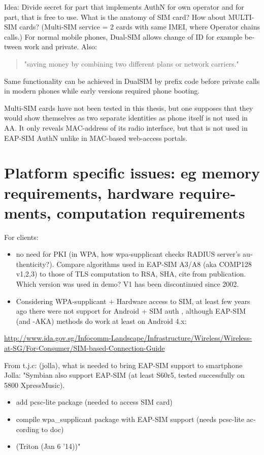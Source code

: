 \documentclass[12pt,a4paper,english]{tutthesis}
\begin{document}
\begin{otherlanguage}{english}
Idea: Divide secret for part that implements AuthN for own operator and
for part, that is free to use. What is the anatomy of SIM card?  How
about MULTI-SIM cards? (Multi-SIM service = 2 cards with same IMEI,
where Operator chains calls.)  For normal mobile phones, Dual-SIM
allows change of ID for example between work and private. Also:
\begin{quote}
"saving money by combining two different plans or  network carriers." 
\end{quote}

Same functionality can be achieved in DualSIM by prefix code before
private calls in modern phones while early versions required 
phone booting.

Multi-SIM cards have not been tested in this thesis, but one supposes
that they would show themselves as two separate identities as 
phone itself is not used in AA. It only reveals  MAC-address of its
radio interface, but that is not used in EAP-SIM AuthN unlike in MAC-based web-access portals.


\section{Platform specific issues: eg memory requirements, hardware requirements, computation requirements}
\label{sec-6-3}

For clients: 
\begin{itemize}
\item no need for PKI (in WPA, how wpa-supplicant checks RADIUS server's
authenticity?). Compare algorithms used in EAP-SIM A3/A8 (aka
COMP128 v1,2,3) to those of
TLS computation to RSA, SHA, cite from publication.
Which version was used in demo? V1 has been discontinued since 2002.

\item Considering WPA-supplicant + Hardware access to SIM,
at least few years ago there were not support for Android + SIM
auth \cite{android-sim}, although EAP-SIM (and -AKA) methods do
work at least on Android 4.x:
\end{itemize}
\url{http://www.ida.gov.sg/Infocomm-Landscape/Infrastructure/Wireless/Wireless-at-SG/For-Consumer/SIM-based-Connection-Guide}


From t.j.c: (jolla), what is needed to bring EAP-SIM support
to smartphone Jolla:
"Symbian also support EAP-SIM (at least S60r5, tested successfully on 5800 XpressMusic).

\begin{itemize}
\item add pcsc-lite package (needed to access SIM card)
\item compile wpa\_supplicant package with EAP-SIM support (needs pcsc-lite according to doc)
\item{}
(Triton (Jan 6 '14))"
\end{itemize}


\end{otherlanguage}
\end{document}

